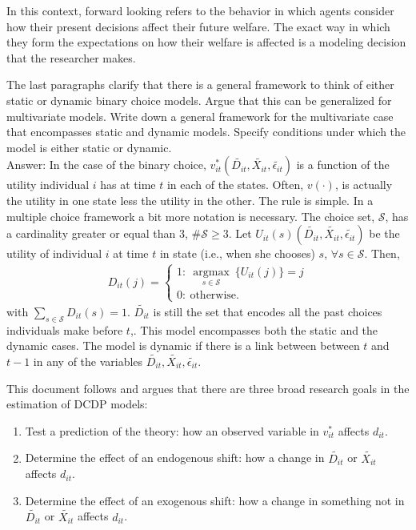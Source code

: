 \begin{remark}
In this context, forward looking refers to the behavior in which agents consider how their present decisions affect their future welfare. The exact way in which they form the expectations on how their welfare is affected is a modeling decision that the researcher makes.
\end{remark}

\begin{exercise}
The last paragraphs clarify that there is a general framework to think of either static or dynamic binary choice models. Argue that this can be generalized for multivariate models. Write down a general framework for the multivariate case that encompasses static and dynamic models. Specify conditions under which the model is either static or dynamic.\\
\noindent Answer:
\noindent In the case of the binary choice, $v_{it}^* \left( \tilde{D_{it}}, \tilde{X_{it}}, \tilde{\epsilon_{it}} \right)$ is a function of the utility individual $i$ has at time $t$ in each of the states. Often, $v(\cdot)$, is actually the utility in one state less the utility in the other. The rule is simple. In a multiple choice framework a bit more notation is necessary. The choice set, $\mathcal{S}$, has a cardinality greater or equal than $3$, $\# \mathcal{S} \geq 3$. Let $U_{it}(s) \left( \tilde{D_{it}}, \tilde{X_{it}}, \tilde{\epsilon_{it}} \right)$ be the utility of individual $i$ at time $t$ in state (i.e., when she chooses) $s$, $\forall s \in \mathcal{S}$. Then,
 \begin{eqnarray}
   D_{it}(j) = \left\{
     \begin{array}{lr}
       1  : \ \underset{s \in \mathcal{S}}{\operatorname{argmax}} \ \{U_{it}(j)\} = j \\
       0  : \ \text{otherwise}. 
     \end{array}
   \right.
\end{eqnarray}
\noindent with $\sum \limits _{s \in \mathcal{S}} D_{it}(s) = 1$. $\tilde{D_{it}}$ is still the set that encodes all the past choices individuals make before $t$,. This model encompasses both the static and the dynamic cases. The model is dynamic if there is a link between between $t$ and $t-1$ in any of the variables $\tilde{D_{it}}, \tilde{X_{it}}, \tilde{\epsilon_{it}}$. 
\end{exercise}

\indent This document follows \citet{keane2011structural} and argues that there are three broad research goals in the estimation of DCDP models:
\begin{enumerate}
\item Test a prediction of the theory: how an observed variable in $v_{it}^*$ affects $d_{it}$.
\item Determine the effect of an endogenous shift: how a change in $\tilde{D_{it}}$ or $\tilde{X_{it}}$ affects $d_{it}$.
\item Determine the effect of an exogenous shift: how a change in something not in $\tilde{D_{it}}$ or $\tilde{X_{it}}$ affects $d_{it}$.
\end{enumerate}

